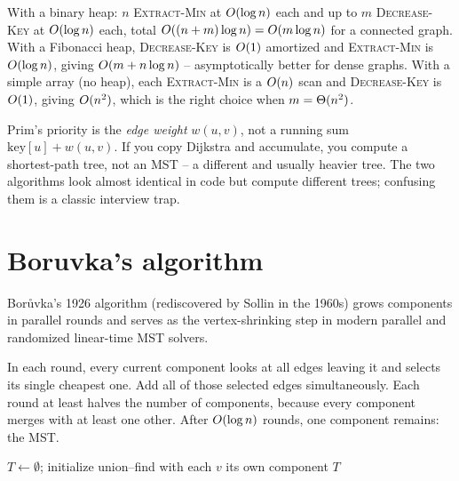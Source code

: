 \begin{complexitybox}
With a binary heap: $n$ \textsc{Extract-Min} at $O(\log n)$ each and up to $m$ \textsc{Decrease-Key} at $O(\log n)$ each, total $O((n+m)\log n)=O(m\log n)$ for a connected graph. With a Fibonacci heap, \textsc{Decrease-Key} is $O(1)$ amortized and \textsc{Extract-Min} is $O(\log n)$, giving $O(m+n\log n)$ -- asymptotically better for dense graphs. With a simple array (no heap), each \textsc{Extract-Min} is a $O(n)$ scan and \textsc{Decrease-Key} is $O(1)$, giving $O(n^2)$, which is the right choice when $m=\Theta(n^2)$.
\end{complexitybox}

\begin{trapbox}
Prim's priority is the \emph{edge weight} $w(u,v)$, not a running sum $\mathrm{key}[u]+w(u,v)$. If you copy Dijkstra and accumulate, you compute a shortest-path tree, not an MST -- a different and usually heavier tree. The two algorithms look almost identical in code but compute different trees; confusing them is a classic interview trap.
\end{trapbox}

\section{Boruvka's algorithm}

Bor\r{u}vka's 1926 algorithm (rediscovered by Sollin in the 1960s) grows components in parallel rounds and serves as the vertex-shrinking step in modern parallel and randomized linear-time MST solvers.

\begin{intuitionbox}
In each round, every current component looks at all edges leaving it and selects its single cheapest one. Add all of those selected edges simultaneously. Each round at least halves the number of components, because every component merges with at least one other. After $O(\log n)$ rounds, one component remains: the MST.
\end{intuitionbox}

\begin{algorithm}[H]
\caption{Boruvka-MST}
\label{ch06:boruvka}
$T\gets\emptyset$; initialize union--find with each $v$ its own component\;
\Return $T$\;
\end{algorithm}

